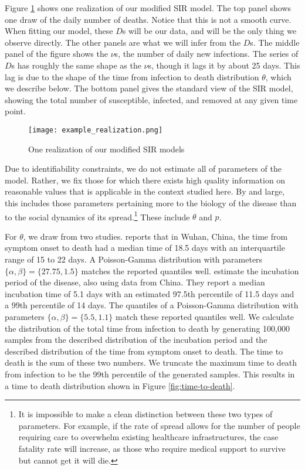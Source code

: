 \documentclass[11pt]{article}
\theoremstyle{plain}
\newcommand{\1}{\mathbf 1}
\begin{document}
Figure \ref{fig:realization} shows one realization of our modified SIR model. The top panel shows one draw of the daily number of deaths. Notice that this is not a smooth curve. When fitting our model, these $D$s will be our data, and will be the only thing we observe directly. The other panels are what we will infer from the $D$s. The middle panel of the figure shows the $\nu$s, the number of daily new infections. The series of $D$s has roughly the same shape as the $\nu$s, though it lags it by about 25 days. This lag is due to the shape of the time from infection to death distribution $\theta$, which we describe below. The bottom panel gives the standard view of the SIR model, showing the total number of susceptible, infected, and removed at any given time point.

\begin{figure}[h]
\centering
\texttt{[image: example\_realization.png]}
\caption{\label{fig:realization}One realization of our modified SIR models}
\end{figure}

Due to identifiability constraints, we do not estimate all of parameters of the model. Rather, we fix those for which there exists high quality information on reasonable values that is applicable in the context studied here. By and large, this includes those parameters pertaining more to the biology of the disease than to the social dynamics of its spread.\footnote{It is impossible to make a clean distinction between these two types of parameters. For example, if the rate of spread allows for the number of people requiring care to overwhelm existing healthcare infrastructures, the case fatality rate will increase, as those who require medical support to survive but cannot get it will die.} These include $\theta$ and $p$. 

For $\theta$, we draw from two studies. \citet{zhou2020clinical} reports that in Wuhan, China, the time from symptom onset to death had a median time of 18.5 days with an interquartile range of 15 to 22 days. A Poisson-Gamma distribution with parameters $\{\alpha, \beta\} = \{27.75, 1.5\}$ matches the reported quantiles well. \citet{lauer2020incubation} estimate the incubation period of the disease, also using data from China. They report a median incubation time of 5.1 days with an estimated 97.5th percentile of 11.5 days and a 99th percentile of 14 days. The quantiles of a Poisson-Gamma distribution with parameters $\{\alpha, \beta\} = \{5.5, 1.1\}$ match these reported quantiles well. We calculate the distribution of the total time from infection to death by generating 100,000 samples from the described distribution of the incubation period and the described distribution of the time from symptom onset to death. The time to death is the sum of these two numbers. We truncate the maximum time to death from infection to be the 99th percentile of the generated samples. This results in a time to death distribution shown in Figure \ref{fig:time-to-death}.
\end{document}
